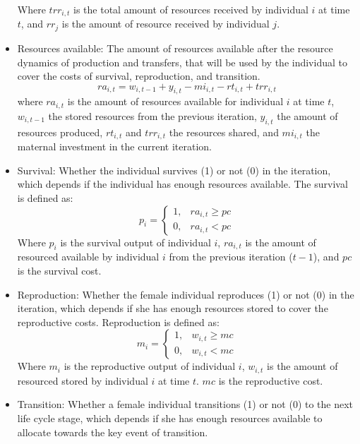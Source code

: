 \documentclass{article}
\begin{document}
\begin{itemize}
\begin{equation}
\end{equation}
        Where $trr_{i,t}$ is the total amount of resources received by individual $i$ at time $t$, and $rr_j$ is the amount of resource received by individual $j$.
        \item Resources available: The amount of resources available after the resource dynamics of production and transfers, that will be used by the individual to cover the costs of survival, reproduction, and transition.
\begin{equation}
    ra_{i,t}=w_{i,t-1}+y_{i,t}-mi_{i,t}-rt_{i,t}+trr_{i,t}        
\end{equation}
        where $ra_{i,t}$ is the amount of resources available for individual $i$ at time $t$, $w_{i,t-1}$ the stored resources from the previous iteration, $y_{i,t}$ the amount of resources produced, $rt_{i,t}$ and $trr_{i,t}$ the resources shared, and $mi_{i,t}$ the maternal investment in the current iteration.
        \item Survival: Whether the individual survives (1) or not (0) in the iteration, which depends if the individual has enough resources available. The survival is defined as:
\begin{equation}
    p_i=\begin{cases}
    1,& ra_{i,t} \geq pc\\
    0,& ra_{i,t} < pc
\end{cases}
\end{equation}
        Where $p_i$ is the survival output of individual $i$, $ra_{i,t}$ is the amount of resourced available by individual $i$ from the previous iteration ($t-1$), and $pc$ is the survival cost.
        \item Reproduction: Whether the female individual reproduces (1) or not (0) in the iteration, which depends if she has enough resources stored to cover the reproductive costs. Reproduction is defined as:
\begin{equation}
    m_i=\begin{cases}
    1,& w_{i,t} \geq mc\\
    0,& w_{i,t} < mc
\end{cases}
\end{equation}
        Where $m_i$ is the reproductive output of individual $i$, $w_{i,t}$ is the amount of resourced stored by individual $i$ at time $t$. $mc$ is the reproductive cost.
        \item Transition: Whether a female individual transitions (1) or not (0) to the next life cycle stage, which depends if she has enough resources available to allocate towards the key event of transition.

\end{itemize}
\end{document}
